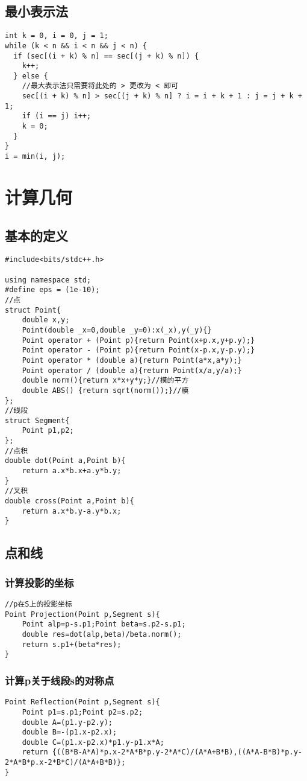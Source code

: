 \documentclass[twocolumn,a4]{article}
\begin{document}
\subsection{最小表示法}
\begin{lstlisting}
int k = 0, i = 0, j = 1;
while (k < n && i < n && j < n) {
  if (sec[(i + k) % n] == sec[(j + k) % n]) {
    k++;
  } else {
    //最大表示法只需要将此处的 > 更改为 < 即可
    sec[(i + k) % n] > sec[(j + k) % n] ? i = i + k + 1 : j = j + k + 1;
    if (i == j) i++;
    k = 0;
  }
}
i = min(i, j);
\end{lstlisting}
\section{计算几何}
\subsection{基本的定义}
\begin{lstlisting}
#include<bits/stdc++.h>

using namespace std;
#define eps = (1e-10);
//点
struct Point{
    double x,y;
    Point(double _x=0,double _y=0):x(_x),y(_y){}
    Point operator + (Point p){return Point(x+p.x,y+p.y);}
    Point operator - (Point p){return Point(x-p.x,y-p.y);}
    Point operator * (double a){return Point(a*x,a*y);}
    Point operator / (double a){return Point(x/a,y/a);}
    double norm(){return x*x+y*y;}//模的平方
    double ABS() {return sqrt(norm());}//模
};
//线段
struct Segment{
    Point p1,p2;
};
//点积
double dot(Point a,Point b){
    return a.x*b.x+a.y*b.y;
}
//叉积
double cross(Point a,Point b){
    return a.x*b.y-a.y*b.x;
}
\end{lstlisting}
\subsection{点和线}
\subsubsection{计算投影的坐标}
\begin{lstlisting}
//p在S上的投影坐标
Point Projection(Point p,Segment s){
    Point alp=p-s.p1;Point beta=s.p2-s.p1;
    double res=dot(alp,beta)/beta.norm();
    return s.p1+(beta*res);
}
\end{lstlisting}
\subsubsection{计算p关于线段s的对称点}
\begin{lstlisting}
Point Reflection(Point p,Segment s){
    Point p1=s.p1;Point p2=s.p2;
    double A=(p1.y-p2.y);
    double B=-(p1.x-p2.x);
    double C=(p1.x-p2.x)*p1.y-p1.x*A;
    return {((B*B-A*A)*p.x-2*A*B*p.y-2*A*C)/(A*A+B*B),((A*A-B*B)*p.y-2*A*B*p.x-2*B*C)/(A*A+B*B)};
}
\end{lstlisting}
\end{document}

